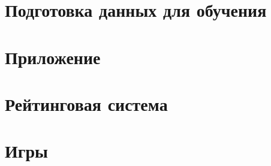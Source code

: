 \label{work}


\section{Подготовка данных для обучения}



\section{Приложение}



\section{Рейтинговая система}



\section{Игры}

















